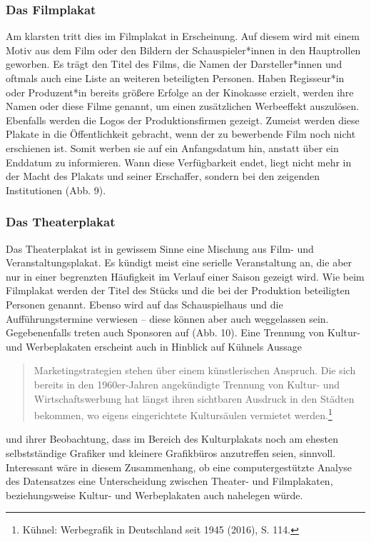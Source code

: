\documentclass[a4paper,12pt,ngerman]{article}
\begin{document}
\subsubsection{Das Filmplakat}
Am klarsten tritt dies im Filmplakat in Erscheinung. Auf diesem wird mit einem Motiv aus dem Film oder den Bildern der Schauspieler*innen in den Hauptrollen geworben. Es trägt den Titel des Films, die Namen der Darsteller*innen und oftmals auch eine Liste an weiteren beteiligten Personen. Haben Regisseur*in oder Produzent*in bereits größere Erfolge an der Kinokasse erzielt, werden ihre Namen oder diese Filme genannt, um einen zusätzlichen Werbeeffekt auszulösen. Ebenfalls werden die Logos der Produktionsfirmen gezeigt. Zumeist werden diese Plakate in die Öffentlichkeit gebracht, wenn der zu bewerbende Film noch nicht erschienen ist. Somit werben sie auf ein Anfangsdatum hin, anstatt über ein Enddatum zu informieren. Wann diese Verfügbarkeit endet, liegt nicht mehr in der Macht des Plakats und seiner Erschaffer, sondern bei den zeigenden Institutionen (Abb. 9). \\

\subsubsection{Das Theaterplakat}
Das Theaterplakat ist in gewissem Sinne eine Mischung aus Film- und Veranstaltungsplakat. Es kündigt meist eine serielle Veranstaltung an, die aber nur in einer begrenzten Häufigkeit im Verlauf einer Saison gezeigt wird. Wie beim Filmplakat werden der Titel des Stücks und die bei der Produktion beteiligten Personen genannt. Ebenso wird auf das Schauspielhaus und die Aufführungstermine verwiesen -- diese können aber auch weggelassen sein. Gegebenenfalls treten auch Sponsoren auf (Abb. 10). Eine Trennung von Kultur- und Werbeplakaten erscheint auch in Hinblick auf Kühnels Aussage

\blockquote{\fontsize{10pt}{12pt} \selectfont Marketingstrategien stehen über einem künstlerischen Anspruch. Die sich bereits in den 1960er-Jahren angekündigte Trennung von Kultur- und Wirtschaftswerbung hat längst ihren sichtbaren Ausdruck in den Städten bekommen, wo eigens eingerichtete Kultursäulen vermietet werden.\footnote{Kühnel: Werbegrafik in Deutschland seit 1945 (2016), S. 114.}\\}

und ihrer Beobachtung, dass im Bereich des Kulturplakats noch am ehesten selbstständige Grafiker und kleinere Grafikbüros anzutreffen seien, sinnvoll. Interessant wäre in diesem Zusammenhang, ob eine computergestützte Analyse des Datensatzes eine Unterscheidung zwischen Theater- und Filmplakaten, beziehungsweise Kultur- und Werbeplakaten auch nahelegen würde. \\
\end{document}
